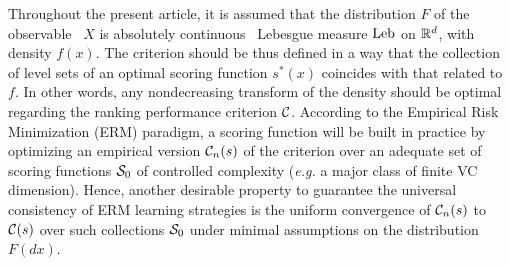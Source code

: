Throughout the present article, it is assumed that the distribution $F$ of the observable \rv~$X$ is absolutely continuous \wrt~Lebesgue measure $\leb$ on
$\rset^d$, with density $f(x)$.  The criterion should be thus defined in a way that the collection of level sets of an optimal scoring function $s^*(x)$ coincides with that related to $f$.  In other words, any nondecreasing transform of the density should be optimal regarding the ranking performance criterion $\crit$. According to the Empirical Risk Minimization (ERM) paradigm, a scoring function will be built in practice by optimizing an empirical version $\crit_n(s)$ of the
criterion over an adequate set of scoring functions $\S_0$ of controlled complexity (\textit{e.g.} a major class of finite {\sc VC} dimension). Hence, another desirable property to guarantee the universal consistency of ERM learning strategies is the uniform convergence of
$\crit_n(s)$ to $\crit(s)$  over such collections $\S_0$ under minimal assumptions on the distribution $F(dx)$.

